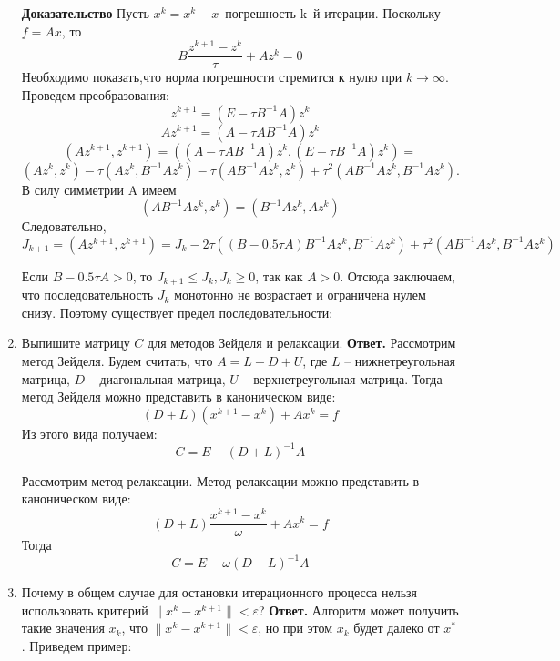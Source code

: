 \documentclass{article}
\begin{document}
\begin{enumerate}
	
	\textbf{Доказательство} Пусть $x^k=x^k-x$--погрешность k--й итерации. Поскольку $f=Ax$, то 
	\[
	B\frac{z^{k+1}-z^k}{\tau} + Az^k = 0
	\]
	Необходимо показать,что норма погрешности стремится к нулю при $k \rightarrow \infty$. Проведем преобразования:
	\[
	z^{k+1}=(E-\tau B^{-1}A)z^k
	\]
	\[
	Az^{k+1}=(A-\tau AB^{-1}A)z^k
	\]
	\[
	(Az^{k+1},z^{k+1})= ((A-\tau AB^{-1}A)z^k, (E-\tau B^{-1}A)z^k)=
	\]
	\[
	(Az^k,z^k)-\tau (Az^k,B^{-1}Az^k) - \tau (AB^{-1}Az^k,z^k) + \tau^2(AB^{-1}Az^k,B^{-1}Az^k).
	\]
	В силу симметрии A имеем 
	\[
	(AB^{-1}Az^k,z^k) = (B^{-1}Az^k, Az^k)
	\]
	Следовательно,
	\[
	J_{k+1}=(Az^{k+1},z^{k+1}) = J_{k} - 2 \tau ((B-0.5 \tau A)B^{-1}Az^k,B^{-1}Az^k) + \tau^2(AB^{-1}Az^k,B^{-1}Az^k)
	\]
	
	
	Если $B-0.5\tau A>0$, то $J_{k+1}\le J_{k}, J_{k} \ge 0$, так как $A>0$. Отсюда заключаем, что последовательность $J_k$ монотонно не возрастает и ограничена нулем снизу. Поэтому существует предел последовательности:

        \item Выпишите матрицу $C$ для методов Зейделя и релаксации.
        \newline
        {\bfseries Ответ.} 
        Рассмотрим метод Зейделя.
        Будем считать, что $A = L + D + U$, где $L$ -- нижнетреугольная матрица, $D$ -- 
        диагональная матрица, $U$ -- верхнетреугольная матрица.
        Тогда метод Зейделя можно представить в каноническом виде: 
        \begin{equation*}
            (D + L)(x^{k+1} -x^k) + Ax^k = f
        \end{equation*}
        Из этого вида получаем:
        \begin{equation*}
            C = E - (D+L)^{-1}A
        \end{equation*}

        Рассмотрим метод релаксации.
        Метод релаксации можно представить в каноническом виде: 
        \begin{equation*}
            (D + L)\frac{x^{k+1} -x^k}{\omega} + Ax^k = f
        \end{equation*}
        Тогда 
        \begin{equation*}
            C = E - \omega(D+L)^{-1}A
        \end{equation*}
        \item Почему в общем случае для остановки итерационного
        процесса нельзя использовать критерий $\|x^k - x^{k+1}\| < \varepsilon$?
        \newline
        {\bfseries Ответ.}
        Алгоритм может получить такие значения $x_k$, что 
        $\|x^k - x^{k+1}\| < \varepsilon$, но при этом $x_k$ будет далеко от $x^*$.
        Приведем пример: 
        

\end{enumerate}
\end{document}
